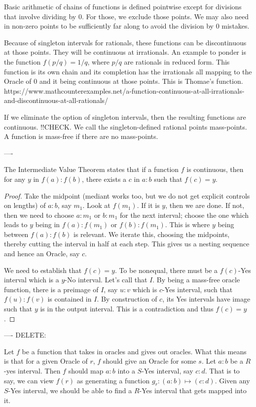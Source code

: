 \documentclass[12pt]{article}
\theoremstyle{remark}
\begin{document}
Basic arithmetic of chains of functions is defined pointwise except for divisions that involve dividing by 0. For those, we exclude those points. We may also need in non-zero points to be sufficiently far along to avoid the division by 0 mistakes. 

Because of singleton intervals for rationals, these functions can be discontinuous at those points. They will be continuous at irrationals. An example to ponder is the function $f(p/q) = 1/q$, where $p/q$ are rationals in reduced form. This function is its own chain and its completion has the irrationals all mapping to the Oracle of 0 and it being continuous at those points. This is Thomae's function. https://www.mathcounterexamples.net/a-function-continuous-at-all-irrationals-and-discontinuous-at-all-rationals/

If we eliminate the option of singleton intervals, then the resulting functions are continuous. !!CHECK. We call the singleton-defined rational points mass-points. A function is mass-free if there are no mass-points. 

----

The Intermediate Value Theorem states that if a function $f$ is continuous, then for any $y$ in $f(a):f(b)$, there exists a $c$ in $a:b$ such that $f(c) = y$. 

\begin{proof}
Take the midpoint (mediant works too, but we do not get explicit controls on lengths) of $a:b$, say $m_1$. Look at $f(m_1)$. If it is $y$, then we are done. If not, then we need to choose $a:m_1$ or $b:m_1$ for the next interval; choose the one which leads to $y$ being in $f(a):f(m_1)$ or $f(b):f(m_1)$. This is where $y$ being between $f(a):f(b)$ is relevant.  We iterate this, choosing the midpoints, thereby cutting the interval in half at each step. This gives us a nesting sequence and hence an Oracle, say $c$. 

We need to establish that $f(c)=y$. To be nonequal, there must be a $f(c)$-Yes interval which is a $y$-No interval. Let's call that $I$. By being a mass-free oracle function, there is a preimage of $I$, say $u:v$ which is $c$-Yes interval, such that $f(u):f(v)$ is contained in $I$. By construction of $c$, its Yes intervals have image such that $y$ is in the output interval. This is a contradiction and thus $f(c)=y$.
\end{proof}


----
DELETE:

Let $f$ be a function that takes in oracles and gives out oracles. What this means is that for a given Oracle of $r$, $f$ should give an Oracle for some $s$. Let $a:b$ be a $R$-yes interval. Then $f$ should map $a:b$ into a $S$-Yes interval, say $c:d$. That is to say, we can view $f(r)$ as generating a function $g_r : (a:b) \mapsto (c:d)$. Given any $S$-Yes interval, we should be able to find a $R$-Yes interval that gets mapped into it. 
\end{document}
